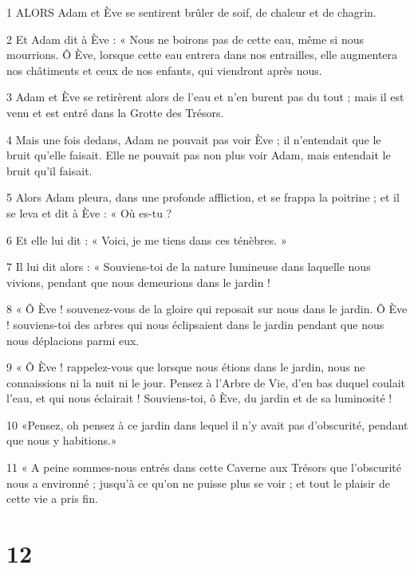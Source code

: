 \par 1 ALORS Adam et Ève se sentirent brûler de soif, de chaleur et de chagrin.

\par 2 Et Adam dit à Ève : « Nous ne boirons pas de cette eau, même si nous mourrions. Ô Ève, lorsque cette eau entrera dans nos entrailles, elle augmentera nos châtiments et ceux de nos enfants, qui viendront après nous.

\par 3 Adam et Ève se retirèrent alors de l'eau et n'en burent pas du tout ; mais il est venu et est entré dans la Grotte des Trésors.

\par 4 Mais une fois dedans, Adam ne pouvait pas voir Ève ; il n'entendait que le bruit qu'elle faisait. Elle ne pouvait pas non plus voir Adam, mais entendait le bruit qu'il faisait.

\par 5 Alors Adam pleura, dans une profonde affliction, et se frappa la poitrine ; et il se leva et dit à Ève : « Où es-tu ?

\par 6 Et elle lui dit : « Voici, je me tiens dans ces ténèbres. »

\par 7 Il lui dit alors : « Souviens-toi de la nature lumineuse dans laquelle nous vivions, pendant que nous demeurions dans le jardin !

\par 8 « Ô Ève ! souvenez-vous de la gloire qui reposait sur nous dans le jardin. Ô Ève ! souviens-toi des arbres qui nous éclipsaient dans le jardin pendant que nous nous déplacions parmi eux.

\par 9 « Ô Ève ! rappelez-vous que lorsque nous étions dans le jardin, nous ne connaissions ni la nuit ni le jour. Pensez à l’Arbre de Vie, d’en bas duquel coulait l’eau, et qui nous éclairait ! Souviens-toi, ô Ève, du jardin et de sa luminosité !

\par 10 «Pensez, oh pensez à ce jardin dans lequel il n'y avait pas d'obscurité, pendant que nous y habitions.»

\par 11 « A peine sommes-nous entrés dans cette Caverne aux Trésors que l'obscurité nous a environné ; jusqu'à ce qu'on ne puisse plus se voir ; et tout le plaisir de cette vie a pris fin.

\chapter{12}

